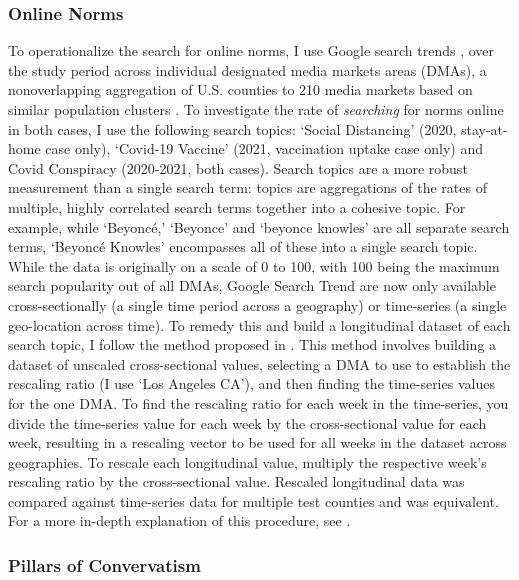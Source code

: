\hypertarget{online-norms}{%
\subsubsection{Online Norms}\label{online-norms}}

To operationalize the search for online norms, I use Google search trends \citep{googletrends},
over the study period across individual designated media markets areas (DMAs), a
nonoverlapping aggregation of U.S. counties to 210 media markets based on
similar population clusters \citep{dma_key}. To investigate the rate of \emph{searching} for norms
online in both cases, I use the following search topics: `Social Distancing'
(2020, stay-at-home case only), `Covid-19 Vaccine' (2021, vaccination uptake case
only) and Covid Conspiracy (2020-2021, both cases). Search topics are a more
robust measurement than a single search term: topics are aggregations of the
rates of multiple, highly correlated search terms together into a cohesive
topic. For example, while `Beyoncé,' `Beyonce' and `beyonce knowles' are all
separate search terms, `Beyoncé Knowles' encompasses all of these into a single
search topic. While the data is originally on a scale of 0 to 100, with
100 being the maximum search popularity out of all DMAs, Google Search Trend are
now only available cross-sectionally (a single time period across a geography)
or time-series (a single geo-location across time). To remedy this and build a
longitudinal dataset of each search topic, I follow the method proposed in \citet[p. 5]{park_etal}.
This method involves building a dataset of unscaled
cross-sectional values, selecting a DMA to use to establish the rescaling ratio
(I use `Los Angeles CA'), and then finding the time-series values for the one
DMA. To find the rescaling ratio for each week in the time-series, you divide
the time-series value for each week by the cross-sectional value for each week,
resulting in a rescaling vector to be used for all weeks in the dataset across
geographies. To rescale each longitudinal value, multiply the respective week's
rescaling ratio by the cross-sectional value. Rescaled longitudinal data was
compared against time-series data for multiple test counties and was equivalent.
For a more in-depth explanation of this procedure, see \citet[p. 5]{park_etal}.

\hypertarget{pillars-of-convervatism}{%
\subsubsection{Pillars of Convervatism}\label{pillars-of-convervatism}}

